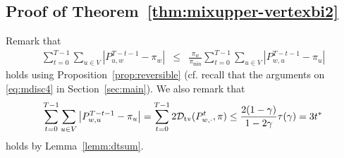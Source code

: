 \documentclass[letter, 11pt]{article}
\newcommand{\1}{\mbox{1}\hspace{-0.25em}\mbox{l}}
\begin{document}
\subsection{Proof of Theorem~\ref{thm:mixupper-vertexbi2}}\label{appendix:billiard}
Remark that
\begin{eqnarray}
\label{eq:reverseP}
\sum_{t=0}^{T-1} \sum_{u\in V} \left| P^{T-t-1}_{u, w}-\pi_w \right|
&\leq & \frac{\pi_w}{\pi_{\min}} \sum_{t=0}^{T-1} \sum_{u\in V} \left| P^{T-t-1}_{w, u}-\pi_u \right|
\end{eqnarray}
holds using Proposition~\ref{prop:reversible} (cf. recall that the arguments on \eqref{eq:mdisc4} in Section~\ref{sec:main}). 
We also remark that
\begin{eqnarray}
\label{eq:mixbi}
\sum_{t=0}^{T-1} \sum_{u\in V} \left| P^{T-t-1}_{w, u}-\pi_u \right|=\sum_{t=0}^{T-1} 2{\cal D}_{\rm tv} (P^t_{w,\cdot},\pi)\leq \frac{2(1-\gamma)}{1-2\gamma}\tau( \gamma)=3t^*
\end{eqnarray}
holds by Lemma~\ref{lemm:dtsum}. 
\end{document}
